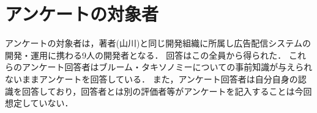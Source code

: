 \section{アンケートの対象者}
アンケートの対象者は，著者(山川)と同じ開発組織に所属し広告配信システムの開発・運用に携わる9人の開発者となる．
回答はこの全員から得られた．
これらのアンケート回答者はブルーム・タキソノミーについての事前知識が与えられないままアンケートを回答している．
また，アンケート回答者は自分自身の認識を回答しており，回答者とは別の評価者等がアンケートを記入することは今回想定していない．
